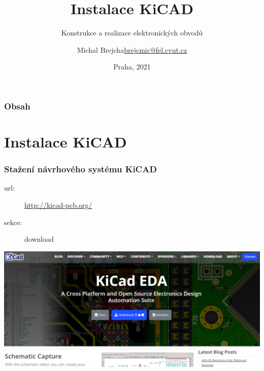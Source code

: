 \documentclass{beamer}
\title[Instalace KiCAD]{Instalace KiCAD}
\subtitle[KEO] {Konstrukce a realizace elektronických obvodů}
\author[Brejcha]{\texorpdfstring{Michal Brejcha\newline\url{brejcmic@fel.cvut.cz}}{Michal Brejcha}}
\institute[ČVUT]{ČVUT v Praze, FEL}
\date[Praha, 2021]{Praha, 2021}
\begin{document}
\frame{\titlepage}

\begin{frame}
\frametitle{Obsah} 
\tableofcontents
\end{frame}


\section{\texorpdfstring{Instalace KiCAD}{Instalace Kicad}}
	\begin{frame}
    \frametitle{Stažení návrhového systému KiCAD}
		
		\begin{description}
			\item[url:] \url{http://kicad-pcb.org/}
			\item[sekce:] download
		\end{description}
		
		\begin{center}
			\includegraphics[scale=0.3]{obr/kicad_url.png}
		\end{center}
	\end{frame}
\end{document}
